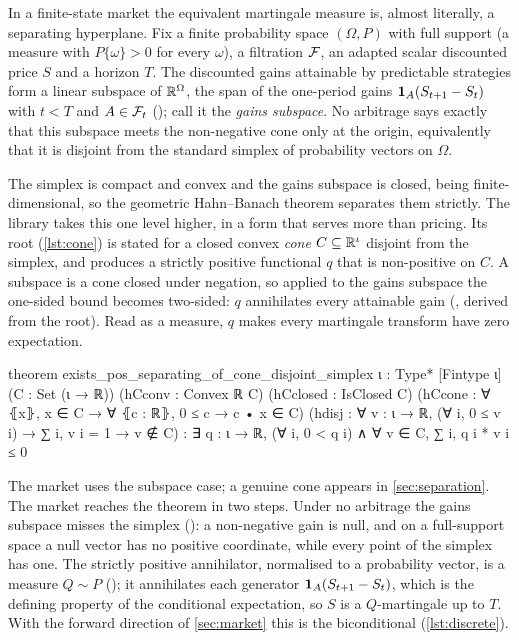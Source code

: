\documentclass[11pt]{article}
\begin{document}
In a finite-state market the equivalent martingale measure is, almost literally, a separating
hyperplane. Fix a finite probability space $(\Omega,P)$ with full support (a measure with $P\{\omega\}>0$
for every $\omega$), a filtration $\mathcal{F}$, an adapted scalar discounted price $S$ and a horizon $T$. The
discounted gains attainable by predictable strategies form a linear subspace of $\mathbb{R}^\Omega$, the span of the
one-period gains $\mathbf{1}_A(S_{t+1}-S_t)$ with $t<T$ and $A\in\mathcal{F}_t$ (); call it the
\emph{gains subspace}. No arbitrage says exactly that this subspace meets the non-negative cone only at the origin,
equivalently that it is disjoint from the standard simplex of probability vectors on $\Omega$.

The simplex is compact and convex and the gains subspace is closed, being finite-dimensional, so the
geometric Hahn--Banach theorem separates them strictly. The library takes this one level higher, in a
form that serves more than pricing. Its root (\cref{lst:cone}) is stated for a closed convex
\emph{cone} $C\subseteq\mathbb{R}^\iota$ disjoint from the simplex, and produces a strictly positive functional
$q$ that is non-positive on $C$. A subspace is a cone closed under negation, so applied to the gains
subspace the one-sided bound becomes two-sided: $q$ annihilates every attainable gain
(, derived from the root). Read as a measure, $q$ makes every
martingale transform have zero expectation.

\begin{leancode}[caption={The cone-separation root (\texttt{Foundations/ConvexDuality}).},label=lst:cone]
theorem exists_pos_separating_of_cone_disjoint_simplex
    {ι : Type*} [Fintype ι]
    (C : Set (ι → ℝ)) (hCconv : Convex ℝ C) (hCclosed : IsClosed C)
    (hCcone : ∀ ⦃x⦄, x ∈ C → ∀ ⦃c : ℝ⦄, 0 ≤ c → c • x ∈ C)
    (hdisj : ∀ v : ι → ℝ, (∀ i, 0 ≤ v i) → ∑ i, v i = 1 → v ∉ C) :
    ∃ q : ι → ℝ, (∀ i, 0 < q i) ∧ ∀ v ∈ C, ∑ i, q i * v i ≤ 0
\end{leancode}

The market uses the subspace case; a genuine cone appears in \cref{sec:separation}. The market reaches the theorem in two steps.
Under no arbitrage the gains subspace misses the simplex
(): a non-negative gain is null, and on a full-support space a null
vector has no positive coordinate, while every point of the simplex has one. The strictly positive
annihilator, normalised to a probability vector, is a measure $Q\sim P$ (); it
annihilates each generator $\mathbf{1}_A(S_{t+1}-S_t)$, which is the defining property of the conditional expectation, so $S$ is a
$Q$-martingale up to $T$. With the forward direction of \cref{sec:market} this is the biconditional
(\cref{lst:discrete}).
\end{document}
